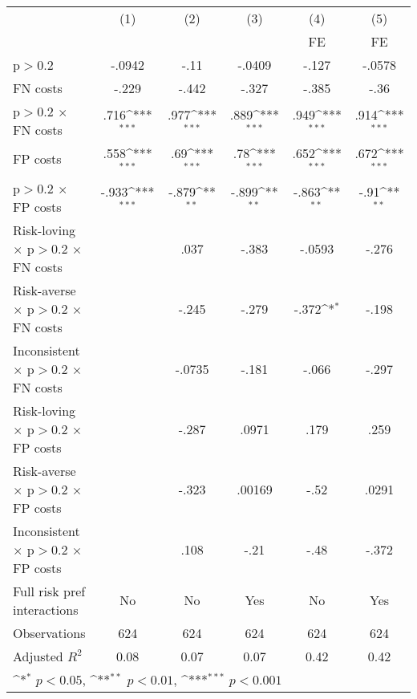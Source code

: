 {
\def\sym#1{\ifmmode^{#1}\else\(^{#1}\)\fi}
\begin{tabular}{l*{5}{c}}
\hline\hline
                &\multicolumn{1}{c}{(1)}&\multicolumn{1}{c}{(2)}&\multicolumn{1}{c}{(3)}&\multicolumn{1}{c}{(4)}&\multicolumn{1}{c}{(5)}\\
                &\multicolumn{1}{c}{}&\multicolumn{1}{c}{}&\multicolumn{1}{c}{}&\multicolumn{1}{c}{FE}&\multicolumn{1}{c}{FE}\\
\hline
p$>$0.2         &   -.0942         &     -.11         &   -.0409         &    -.127         &   -.0578         \\
FN costs        &    -.229         &    -.442         &    -.327         &    -.385         &     -.36         \\
p$>$0.2 $\times$ FN costs&     .716\sym{***}&     .977\sym{***}&     .889\sym{***}&     .949\sym{***}&     .914\sym{***}\\
FP costs        &     .558\sym{***}&      .69\sym{***}&      .78\sym{***}&     .652\sym{***}&     .672\sym{***}\\
p$>$0.2 $\times$ FP costs&    -.933\sym{***}&    -.879\sym{**} &    -.899\sym{**} &    -.863\sym{**} &     -.91\sym{**} \\
Risk-loving $\times$ p$>$0.2 $\times$ FN costs&                  &     .037         &    -.383         &   -.0593         &    -.276         \\
Risk-averse $\times$ p$>$0.2 $\times$ FN costs&                  &    -.245         &    -.279         &    -.372\sym{*}  &    -.198         \\
Inconsistent $\times$ p$>$0.2 $\times$ FN costs&                  &   -.0735         &    -.181         &    -.066         &    -.297         \\
Risk-loving $\times$ p$>$0.2 $\times$ FP costs&                  &    -.287         &    .0971         &     .179         &     .259         \\
Risk-averse $\times$ p$>$0.2 $\times$ FP costs&                  &    -.323         &   .00169         &     -.52         &    .0291         \\
Inconsistent $\times$ p$>$0.2 $\times$ FP costs&                  &     .108         &     -.21         &     -.48         &    -.372         \\
Full risk pref interactions&       No         &       No         &      Yes         &       No         &      Yes         \\
\hline
Observations    &      624         &      624         &      624         &      624         &      624         \\
Adjusted \(R^{2}\)&     0.08         &     0.07         &     0.07         &     0.42         &     0.42         \\
\hline\hline
\multicolumn{6}{l}{\footnotesize \sym{*} \(p<0.05\), \sym{**} \(p<0.01\), \sym{***} \(p<0.001\)}\\
\end{tabular}
}
